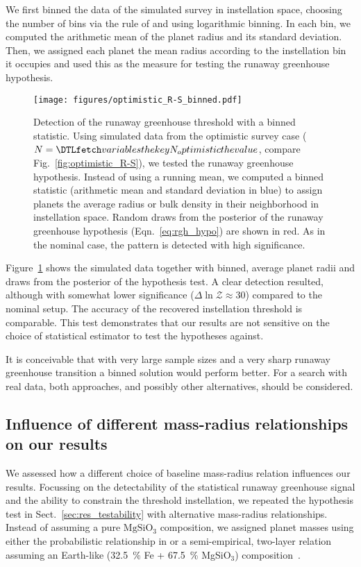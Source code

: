 \documentclass[twocolumn,twocolappendix]{aastex631}
\begin{document}
We first binned the data of the simulated survey in instellation space, choosing the number of bins via the rule of \citet{Freedman1981} and using logarithmic binning.
In each bin, we computed the arithmetic mean of the planet radius and its standard deviation.
Then, we assigned each planet the mean radius according to the instellation bin it occupies and used this as the measure for testing the runaway greenhouse hypothesis.

\begin{figure}[ht!]
    \begin{centering}
        \texttt{[image: figures/optimistic\_R-S\_binned.pdf]}
        \caption{
            Detection of the runaway greenhouse threshold with a binned statistic.
            Using simulated data from the optimistic survey case ($N = \var{N_optimistic}$, compare Fig.~\ref{fig:optimistic_R-S}), we tested the runaway greenhouse hypothesis. Instead of using a running mean, we computed a binned statistic (arithmetic mean and standard deviation in blue) to assign planets the average radius or bulk density in their neighborhood in instellation space. Random draws from the posterior of the runaway greenhouse hypothesis (Eqn.~\ref{eq:rgh_hypo}) are shown in red.
            As in the nominal case, the pattern is detected with high significance.
        }
        \label{fig:optimistic_R-S_binned}
    \end{centering}
\end{figure}
Figure~\ref{fig:optimistic_R-S_binned} shows the simulated data together with binned, average planet radii and draws from the posterior of the hypothesis test.
A clear detection resulted, although with somewhat lower significance ($\Delta \ln \mathcal{Z} \approx 30$) compared to the nominal setup.
The accuracy of the recovered instellation threshold is comparable.
This test demonstrates that our results are not sensitive on the choice of statistical estimator to test the hypotheses against.

It is conceivable that with very large sample sizes and a very sharp runaway greenhouse transition a binned solution would perform better.
For a search with real data, both approaches, and possibly other alternatives, should be considered.

\subsection{Influence of different mass-radius relationships on our results}\label{app:MR_relation}
We assessed how a different choice of baseline mass-radius relation influences our results.
Focussing on the detectability of the statistical runaway greenhouse signal and the ability to constrain the threshold instellation, we repeated the hypothesis test in Sect.~\ref{sec:res_testability} with alternative mass-radius relationships.
Instead of assuming a pure $\mathrm{MgSiO_3}$ composition, we assigned planet masses using either the probabilistic relationship in \citet{Wolfgang2016} or a semi-empirical, two-layer relation assuming an Earth-like (\SI{32.5}{\percent} Fe + \SI{67.5}{\percent} MgSiO$_3$) composition~\citep{Zeng2016}.
\end{document}

